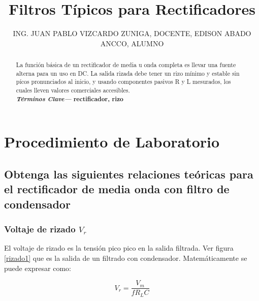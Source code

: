 \documentclass[a4paper]{IEEEtran} %
\providecommand{\keywords}[1]{\textbf{\textit{Términos Clave---}} #1}
\begin{document}
	
	\title{Filtros Típicos para Rectificadores}
	\author{ING. JUAN PABLO VIZCARDO ZUNIGA, DOCENTE, EDISON ABADO ANCCO, ALUMNO
		}
	
	\maketitle
	
	
\begin{abstract}
		La función básica de un rectificador de media u onda completa es llevar una fuente alterna para un uso en DC. La salida rizada debe tener un rizo mínimo y estable sin pícos pronunciados al inicio, y usando componentes pasivos R y L mesurados, los cuales lleven valores comerciales accesibles.\\
		\keywords{\textbf{rectificador, rizo}}
\end{abstract}
	
	
\section{Procedimiento de Laboratorio}


\subsection{Obtenga las siguientes relaciones teóricas para el rectificador de media onda con filtro de condensador}

\subsubsection{Voltaje de rizado $V_r$}

El voltaje de rizado es la tensión pico pico en la salida filtrada. Ver figura \eqref{rizado1} que es la salida de un filtrado con condensador. Matemáticamente se puede expresar como:

\begin{equation}
	V_r = \frac{V_m}{fR_L C}
\end{equation}
\end{document}
